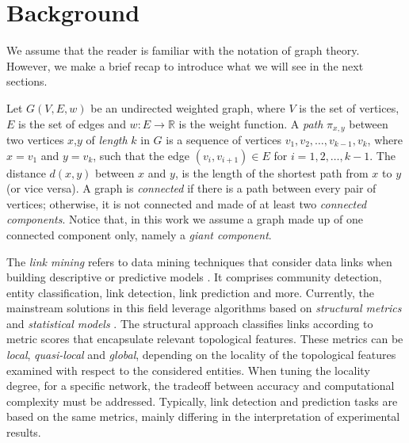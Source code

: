 \section{Background}
\label{sec:background}
We assume that the reader is familiar with the notation of graph theory. 
However, we make a brief recap to introduce what we will see in the next sections.

Let $G(V,E,w)$ be an undirected weighted graph, where $V$ is the set of vertices, $E$ is the set of edges and $w:E\rightarrow\mathbb{R}$ is the weight function. 
A \textit{path} $\pi_{x,y}$ between two vertices $x$,$y$ of \textit{length} $k$ in $G$ is a sequence of vertices $v_{1},v_{2},\ldots,v_{k-1},v_{k}$, where $x = v_{1}$ and $y = v_{k}$, such that the edge $(v_{i},v_{i+1}) \in E$ for $i = 1, 2,\ldots,k-1$. 
The distance $d(x,y)$ between $x$ and $y$, is the length of the shortest path from $x$ to $y$ (or vice versa).
A graph is \textit{connected} if there is a path between every pair of vertices; otherwise, it is not connected and made of at least two \textit{connected components}.
Notice that, in this work we assume a graph made up of one connected component only, namely a \textit{giant component}.

The \textit{link mining} refers to data mining techniques that consider data links when building descriptive or predictive models \cite{getoor2005link}. It comprises community detection, entity classification, link detection, link prediction and more. 
Currently, the mainstream solutions in this field leverage algorithms based on \textit{structural metrics} and \textit{statistical models} \cite{berlusconi2016link,Liben-Nowell,Lu2011}.
The structural approach classifies links according to metric scores that encapsulate relevant topological features. 
These metrics can be \textit{local}, \textit{quasi-local} and \textit{global}, depending on the locality of the topological features examined with respect to the considered entities. 
When tuning the locality degree, for a specific network, the  tradeoff between accuracy and computational complexity must be addressed.
Typically, link detection and prediction tasks are based on the same metrics, mainly differing in the interpretation of experimental results.

